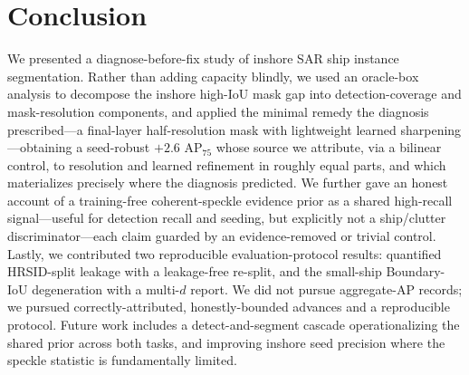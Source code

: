 \documentclass[journal]{IEEEtran}
\begin{document}
\section{Conclusion}
We presented a diagnose-before-fix study of inshore SAR ship instance segmentation. Rather than adding capacity blindly, we used an oracle-box analysis to decompose the inshore high-IoU mask gap into detection-coverage and mask-resolution components, and applied the minimal remedy the diagnosis prescribed---a final-layer half-resolution mask with lightweight learned sharpening---obtaining a seed-robust $+2.6$ AP$_{75}$ whose source we attribute, via a bilinear control, to resolution and learned refinement in roughly equal parts, and which materializes precisely where the diagnosis predicted. We further gave an honest account of a training-free coherent-speckle evidence prior as a shared high-recall signal---useful for detection recall and seeding, but explicitly not a ship/clutter discriminator---each claim guarded by an evidence-removed or trivial control. Lastly, we contributed two reproducible evaluation-protocol results: quantified HRSID-split leakage with a leakage-free re-split, and the small-ship Boundary-IoU degeneration with a multi-$d$ report. We did not pursue aggregate-AP records; we pursued correctly-attributed, honestly-bounded advances and a reproducible protocol. Future work includes a detect-and-segment cascade operationalizing the shared prior across both tasks, and improving inshore seed precision where the speckle statistic is fundamentally limited.



\end{document}
